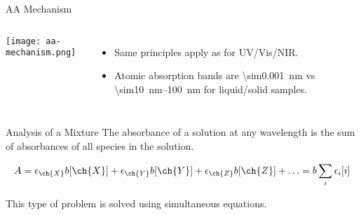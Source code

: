 \documentclass[notes=show]{beamer}
\begin{document}
\begin{frame}{AA Mechanism}
	\begin{columns}
		\begin{center}
			\texttt{[image: aa-mechanism.png]}
		\end{center}
		\begin{itemize}
			\item Same principles apply as for UV/Vis/NIR.
			\item Atomic absorption bands are
				\SI{\sim0.001}{\nano\meter} vs
				\SIrange{\sim10}{100}{\nano\meter} for
				liquid/solid samples.
		\end{itemize}
	\end{columns}
\end{frame}

\begin{frame}{Analysis of a Mixture}
	The absorbance of a solution at any wavelength is the
	\alert{sum} of absorbances of all species in the solution.

	\begin{equation*}
		A = \epsilon_{\ch{X}}b[\ch{X}] + \epsilon_{\ch{Y}}b[\ch{Y}] +
		\epsilon_{\ch{Z}}b[\ch{Z}] + \ldots = b\sum_i \epsilon_i[i]
	\end{equation*}

	This type of problem is solved using \alert{simultaneous equations}.
\end{frame}
%
\end{document}
